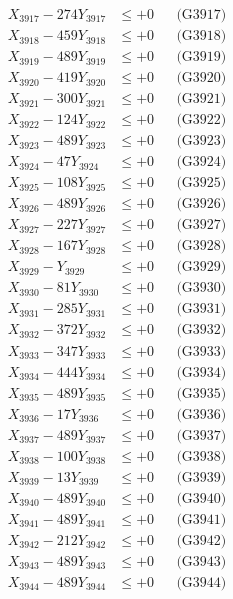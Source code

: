 \documentclass[a4paper,10pt]{article}
\begin{document}
{\begin{align}
X_{3917} - 274Y_{3917} &\leq +0 && \text{(G3917)} \\
X_{3918} - 459Y_{3918} &\leq +0 && \text{(G3918)} \\
X_{3919} - 489Y_{3919} &\leq +0 && \text{(G3919)} \\
X_{3920} - 419Y_{3920} &\leq +0 && \text{(G3920)} \\
\allowbreak
X_{3921} - 300Y_{3921} &\leq +0 && \text{(G3921)} \\
X_{3922} - 124Y_{3922} &\leq +0 && \text{(G3922)} \\
X_{3923} - 489Y_{3923} &\leq +0 && \text{(G3923)} \\
X_{3924} - 47Y_{3924} &\leq +0 && \text{(G3924)} \\
X_{3925} - 108Y_{3925} &\leq +0 && \text{(G3925)} \\
X_{3926} - 489Y_{3926} &\leq +0 && \text{(G3926)} \\
X_{3927} - 227Y_{3927} &\leq +0 && \text{(G3927)} \\
X_{3928} - 167Y_{3928} &\leq +0 && \text{(G3928)} \\
X_{3929} - Y_{3929} &\leq +0 && \text{(G3929)} \\
X_{3930} - 81Y_{3930} &\leq +0 && \text{(G3930)} \\
\allowbreak
X_{3931} - 285Y_{3931} &\leq +0 && \text{(G3931)} \\
X_{3932} - 372Y_{3932} &\leq +0 && \text{(G3932)} \\
X_{3933} - 347Y_{3933} &\leq +0 && \text{(G3933)} \\
X_{3934} - 444Y_{3934} &\leq +0 && \text{(G3934)} \\
X_{3935} - 489Y_{3935} &\leq +0 && \text{(G3935)} \\
X_{3936} - 17Y_{3936} &\leq +0 && \text{(G3936)} \\
X_{3937} - 489Y_{3937} &\leq +0 && \text{(G3937)} \\
X_{3938} - 100Y_{3938} &\leq +0 && \text{(G3938)} \\
X_{3939} - 13Y_{3939} &\leq +0 && \text{(G3939)} \\
X_{3940} - 489Y_{3940} &\leq +0 && \text{(G3940)} \\
\allowbreak
X_{3941} - 489Y_{3941} &\leq +0 && \text{(G3941)} \\
X_{3942} - 212Y_{3942} &\leq +0 && \text{(G3942)} \\
X_{3943} - 489Y_{3943} &\leq +0 && \text{(G3943)} \\
X_{3944} - 489Y_{3944} &\leq +0 && \text{(G3944)} \\

\end{align}}
\end{document}
